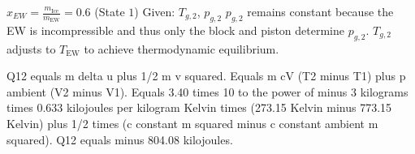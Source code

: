 \( x_{EW} = \frac{m_{\text{Ice}}}{m_{\text{EW}}} = 0.6 \) (State \( 1 \))  
Given: \( T_{g,2} \), \( p_{g,2} \)  
\( p_{g,2} \) remains constant because the EW is incompressible and thus only the block and piston determine \( p_{g,2} \).  
\( T_{g,2} \) adjusts to \( T_{\text{EW}} \) to achieve thermodynamic equilibrium.

Q12 equals m delta u plus 1/2 m v squared.  
Equals m cV (T2 minus T1) plus p ambient (V2 minus V1).  
Equals 3.40 times 10 to the power of minus 3 kilograms times 0.633 kilojoules per kilogram Kelvin times (273.15 Kelvin minus 773.15 Kelvin) plus 1/2 times (c constant m squared minus c constant ambient m squared).  
Q12 equals minus 804.08 kilojoules.